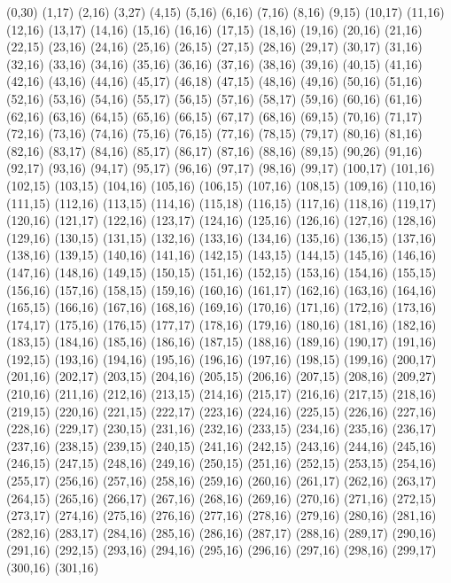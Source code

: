 (0,30)
(1,17)
(2,16)
(3,27)
(4,15)
(5,16)
(6,16)
(7,16)
(8,16)
(9,15)
(10,17)
(11,16)
(12,16)
(13,17)
(14,16)
(15,16)
(16,16)
(17,15)
(18,16)
(19,16)
(20,16)
(21,16)
(22,15)
(23,16)
(24,16)
(25,16)
(26,15)
(27,15)
(28,16)
(29,17)
(30,17)
(31,16)
(32,16)
(33,16)
(34,16)
(35,16)
(36,16)
(37,16)
(38,16)
(39,16)
(40,15)
(41,16)
(42,16)
(43,16)
(44,16)
(45,17)
(46,18)
(47,15)
(48,16)
(49,16)
(50,16)
(51,16)
(52,16)
(53,16)
(54,16)
(55,17)
(56,15)
(57,16)
(58,17)
(59,16)
(60,16)
(61,16)
(62,16)
(63,16)
(64,15)
(65,16)
(66,15)
(67,17)
(68,16)
(69,15)
(70,16)
(71,17)
(72,16)
(73,16)
(74,16)
(75,16)
(76,15)
(77,16)
(78,15)
(79,17)
(80,16)
(81,16)
(82,16)
(83,17)
(84,16)
(85,17)
(86,17)
(87,16)
(88,16)
(89,15)
(90,26)
(91,16)
(92,17)
(93,16)
(94,17)
(95,17)
(96,16)
(97,17)
(98,16)
(99,17)
(100,17)
(101,16)
(102,15)
(103,15)
(104,16)
(105,16)
(106,15)
(107,16)
(108,15)
(109,16)
(110,16)
(111,15)
(112,16)
(113,15)
(114,16)
(115,18)
(116,15)
(117,16)
(118,16)
(119,17)
(120,16)
(121,17)
(122,16)
(123,17)
(124,16)
(125,16)
(126,16)
(127,16)
(128,16)
(129,16)
(130,15)
(131,15)
(132,16)
(133,16)
(134,16)
(135,16)
(136,15)
(137,16)
(138,16)
(139,15)
(140,16)
(141,16)
(142,15)
(143,15)
(144,15)
(145,16)
(146,16)
(147,16)
(148,16)
(149,15)
(150,15)
(151,16)
(152,15)
(153,16)
(154,16)
(155,15)
(156,16)
(157,16)
(158,15)
(159,16)
(160,16)
(161,17)
(162,16)
(163,16)
(164,16)
(165,15)
(166,16)
(167,16)
(168,16)
(169,16)
(170,16)
(171,16)
(172,16)
(173,16)
(174,17)
(175,16)
(176,15)
(177,17)
(178,16)
(179,16)
(180,16)
(181,16)
(182,16)
(183,15)
(184,16)
(185,16)
(186,16)
(187,15)
(188,16)
(189,16)
(190,17)
(191,16)
(192,15)
(193,16)
(194,16)
(195,16)
(196,16)
(197,16)
(198,15)
(199,16)
(200,17)
(201,16)
(202,17)
(203,15)
(204,16)
(205,15)
(206,16)
(207,15)
(208,16)
(209,27)
(210,16)
(211,16)
(212,16)
(213,15)
(214,16)
(215,17)
(216,16)
(217,15)
(218,16)
(219,15)
(220,16)
(221,15)
(222,17)
(223,16)
(224,16)
(225,15)
(226,16)
(227,16)
(228,16)
(229,17)
(230,15)
(231,16)
(232,16)
(233,15)
(234,16)
(235,16)
(236,17)
(237,16)
(238,15)
(239,15)
(240,15)
(241,16)
(242,15)
(243,16)
(244,16)
(245,16)
(246,15)
(247,15)
(248,16)
(249,16)
(250,15)
(251,16)
(252,15)
(253,15)
(254,16)
(255,17)
(256,16)
(257,16)
(258,16)
(259,16)
(260,16)
(261,17)
(262,16)
(263,17)
(264,15)
(265,16)
(266,17)
(267,16)
(268,16)
(269,16)
(270,16)
(271,16)
(272,15)
(273,17)
(274,16)
(275,16)
(276,16)
(277,16)
(278,16)
(279,16)
(280,16)
(281,16)
(282,16)
(283,17)
(284,16)
(285,16)
(286,16)
(287,17)
(288,16)
(289,17)
(290,16)
(291,16)
(292,15)
(293,16)
(294,16)
(295,16)
(296,16)
(297,16)
(298,16)
(299,17)
(300,16)
(301,16)
